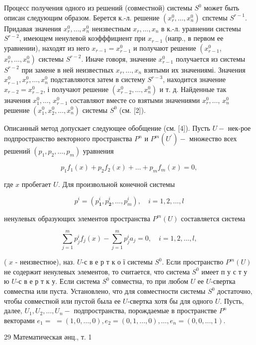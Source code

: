 \documentclass[10pt]{article}
\begin{document}
Процесс получения одного из решений (совместной) системы $S^{0}$ может быть описан следующим образом. Берется к.-л. решение $\left(x_{r}^{0}, \ldots, x_{n}^{0}\right)$ спстемы $S^{r-1}$. Придавая значения $x_{r}^{0}, \ldots, x_{n}^{0}$ неизвестным $x_{r}, \ldots, x_{n}$ в к.-л. уравнении системы $S^{r-2}$, имеющем ненулевой коэфффициент при $x_{r-1}$ (напр., в первом ее уравнении), находят из него $x_{r-1}=x_{r-1}^{0}$ и получают решение $\left(x_{r-1}^{0}\right.$, $\left.x_{r}^{0}, \ldots, x_{n}^{0}\right)$ системы $S^{r-2}$. Иначе говоря, значение $x_{r-1}^{0}$ получается из системы $S^{r-2}$ при замене в ней неизвестных $x_{r}, \ldots, x_{n}$ взятыми их значениямі. Значения $x_{r-1}^{0}, x_{r}^{0}, \ldots, x_{n}^{0}$ подставляются затем в систему $S^{r-3}$, находится значение $x_{r-2}=x_{r-2}^{0}$, і получают решение $\left(x_{r-2}^{0}, \ldots, x_{n}^{0}\right)$ и т. д. Найденные так значения $x_{1}^{0}, \ldots$, $x_{r-1}^{0}$ составляют вместе со взятыми значениями $x_{r}^{0}, \ldots$, $x_{n}^{0}$ решение $\left(x_{1}^{0}, x_{2}^{0}, \ldots, x_{n}^{0}\right)$ системы $S^{0}$ (см. [2]).



Описанный метод допускает следующее обобщение (см. [4]). Пусть $U-$ нек-рое подпространство векторного пространства $P^{n}$ и $P^{m}\left(U^{\prime}\right)-$ множество всех решений $\left(p_{1}, p_{2}, \ldots, p_{m}\right)$ уравнения



\[

p_{1} f_{1}(x)+p_{2} f_{2}(x)+\ldots+p_{m} f_{m}(x)=0,

\]



где $x$ пробегает $U$. Для произвольной конечной системы



\[

p^{i}=\left(p_{\mathbf{1}}^{i}, p_{\mathbf{2}}^{i}, \ldots, p_{m}^{i}\right), \quad i=1,2, \ldots, l

\]



ненулевых образующих элементов пространства $P^{m}(U)$ составляется система



\[

\sum_{j=1}^{m} p_{j}^{i} f_{j}(x)-\sum_{j=1}^{m} p_{j}^{i} a_{j}=0, \quad i=1,2, \ldots, l,

\]



( $x$ - неизвестное), наз. $U$-с в е р т к о ї системы $S^{0}$. Если пространство $P^{m}(U)$ не содержит ненулевых элементов, то считается, что система $S^{0}$ имеет п у с т у ю $U$-с в е р т к у. Если система $S^{0}$ совместна, то при любом $U$ ее $U$-свертка совместна или пуста. Установлено, что для совместности системы $S^{0}$ достаточно, чтобы совместной или пустой была ее $U$-свертка хотя бы для одного $U$. Пусть, далее, $U_{1}, U_{2}, \ldots, U_{n}-$ подпространства, порождаемые в пространстве $P^{n}$ векторами $e_{1}=$ $=(1,0, \ldots, 0), e_{2}=(0,1, \ldots, 0), \ldots, e_{n}=(0,0, \ldots, 1)$.



29 Математическая әнц., т. 1
\end{document}

